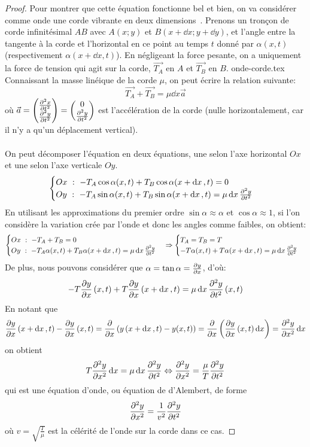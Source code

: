\begin{proof}
Pour montrer que cette équation fonctionne bel et bien, on va considérer comme onde une corde vibrante en deux dimensions~\cite{wiki:onde-corde}.
Prenons un tronçon de corde infinitésimal $AB$ avec $A(x;y)$ et $B(x+\dd{x};y+\dd{y})$, et l'angle entre la tangente
à la corde et l'horizontal en ce point au temps $t$ donné par $\alpha (x,t)$ (respectivement $\alpha (x+\dd{x},t)$).
En négligeant la force pesante, on a uniquement la force de tension qui agit sur la corde, $\vec{T_A}$ en $A$
et $\vec{T_B}$ en $B$.
{onde-corde.tex}
Connaissant la masse linéique de la corde $\mu$, on peut écrire la relation suivante:
\[
    \vec{T_A} + \vec{T_B} = \mu \dd{x} \vec{a}
\]
où $\vec{a} = \mqty(\pdv[2]{x}{t} \\ \pdv[2]{y}{t}) = \mqty(0 \\ \pdv[2]{y}{t})$ est l'accélération de la corde
(nulle horizontalement, car il n'y a qu'un déplacement vertical).\\ \\
On peut décomposer l'équation en deux équations, une selon l'axe horizontal $Ox$ et une selon l'axe verticale $Oy$.
\[
    \begin{cases}
        Ox \ : \ - T_A \cos \alpha (x,t) + T_B \cos \alpha (x+\dd{x},t) = 0 \\
        Oy \ : \ - T_A \sin \alpha (x,t) + T_B \sin \alpha (x+\dd{x},t) = \mu \dd{x} \pdv[2]{y}{t}
    \end{cases}
\]
En utilisant les approximations du premier ordre $\sin \alpha \approx \alpha$ et $\cos \alpha \approx 1$, si l'on
considère la variation crée par l'onde et donc les angles comme faibles, on obtient:
\[
    \begin{cases}
        Ox \ : \ - T_A + T_B = 0 \\
        Oy \ : \ - T_A \alpha (x,t) + T_B \alpha (x+\dd{x},t) = \mu \dd{x} \pdv[2]{y}{t}
    \end{cases}
    \Rightarrow
    \begin{cases}
        T_A = T_B = T \\
        - T \alpha (x,t) + T \alpha (x+\dd{x},t) = \mu \dd{x} \pdv[2]{y}{t}
    \end{cases}
\]
De plus, nous pouvons considérer que $\alpha = \tan \alpha = \pdv{y}{x}$, d'où:
\[
    -T \pdv{y}{x} \left( x,t \right) + T \pdv{y}{x} \left( x+\dd{x},t \right) = \mu \dd{x} \pdv[2]{y}{t} \left( x,t \right)
\]
En notant que
\[
    \pdv{y}{x} \left( x+\dd{x},t \right) - \pdv{y}{x} \left( x,t \right) =
    \pdv{x} \left( y \left( x+\dd{x},t \right) - y(x,t) \right) = \pdv{x} \left(  \pdv{y}{x} \left( x,t \right) \dd{x} \right) =
    \pdv[2]{y}{x} \dd{x}
\]
on obtient
\[
    T \pdv[2]{y}{x} \dd{x} = \mu \dd{x} \pdv[2]{y}{t} \Leftrightarrow \pdv[2]{y}{x} = \frac{\mu}{T} \pdv[2]{y}{t}
\]
qui est une équation d'onde, ou équation de d'Alembert, de forme
\[
    \pdv[2]{y}{x} = \frac{1}{v^2} \pdv[2]{y}{t}
\]
où $v = \sqrt{\frac{T}{\mu}}$ est la célérité de l'onde sur la corde dans ce cas.
\end{proof}
